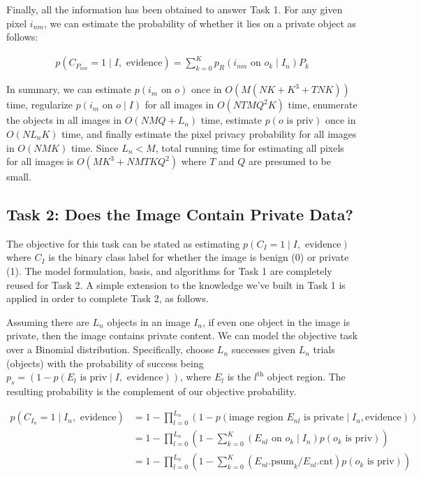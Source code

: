 \documentclass[11pt]{article}
\begin{document}
Finally, all the information has been obtained to answer Task 1.  For any given pixel $i_{nm}$, we can estimate the probability of whether it lies on a private object as follows:

\begin{align}
    p(C_{P_{nm}} = 1 \mid I, \textrm{ evidence}) = \sum_{k=0}^{K} p_R(i_{nm} \textrm{ on } o_k \mid I_n) P_k
\end{align}

In summary, we can estimate $p(i_m \textrm{ on } o)$ once in $O(M(NK + K^3 + TNK))$ time, regularize $p(i_m \textrm{ on } o \mid I)$ for all images in $O(NTMQ^2K)$ time, enumerate the objects in all images in $O(NMQ + L_n)$  time, estimate $p(o \textrm{ is priv})$ once in $O(N L_n K)$ time, and finally estimate the pixel privacy probability for all images in $O(N M K)$ time.  Since $L_n < M$, total running time for estimating all pixels for all images is $O(MK^3 + NMTKQ^2)$ where $T$ and $Q$ are presumed to be small.


\subsection{Task 2: Does the Image Contain Private Data?}

The objective for this task can be stated as estimating $p(C_I = 1 \mid I, \textrm{ evidence})$ where $C_I$ is the binary class label for whether the image is benign (0) or private (1).  The model formulation, basis, and algorithms for Task 1 are completely reused for Task 2.  A simple extension to the knowledge we've built in Task 1 is applied in order to complete Task 2, as follows.

Assuming there are $L_n$ objects in an image $I_n$, if even one object in the image is private, then the image contains private content.  We can model the objective task over a Binomial distribution.  Specifically, choose $L_n$ successes given $L_n$ trials (objects) with the probability of success being $p_s = (1-p(E_l \textrm{ is priv} \mid I, \textrm{ evidence}))$, where $E_l$ is the $l^\textrm{th}$ object region.  The resulting probability is the complement of our objective probability.

\begin{align}\label{eqn:task2.0}
    p(C_{I_{n}} = 1 \mid I_n, \textrm{ evidence}) & = 1 - \prod_{l = 0}^{L_n} \left( 1 - p(\textrm{image region $E_{nl}$ 
        is private} \mid I_n, \textrm{evidence}) \right)\\
    & = 1 - \prod_{l = 0}^{L_n} \left( 1 - \sum_{k=0}^{K} (E_{nl}\textrm{ on } o_k \mid I_n) p(o_k \textrm{ is priv}) \right)\\
    & = 1 - \prod_{l = 0}^{L_n} \left( 1 - \sum_{k=0}^{K} (E_{nl}\textrm{.psum}_k / E_{nl}\textrm{.cnt}) p(o_k \textrm{ is priv}) \right) \label{eqn:objpriv}
\end{align}
\end{document}
